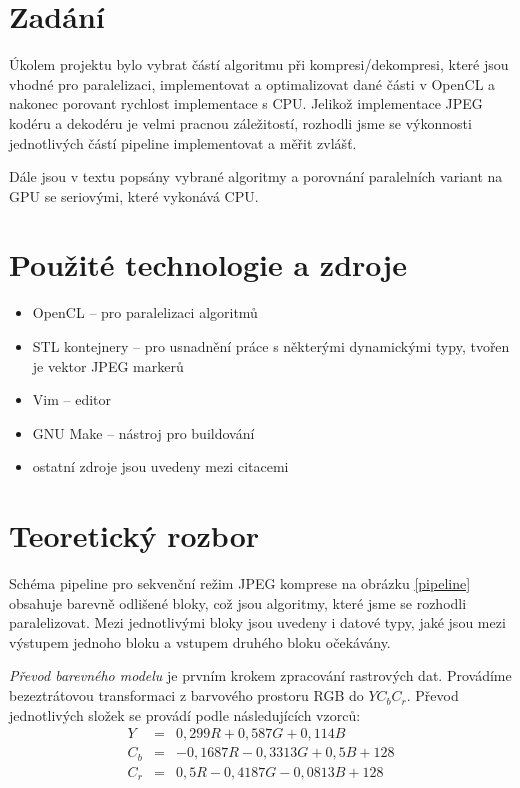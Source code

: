 \documentclass[11pt,a4paper]{article}
\newcommand{\titlepageandcontents}{
  

  \pagestyle{plain}
  \pagenumbering{roman}
  \setcounter{page}{1}

  \newpage
  \pagestyle{plain}
  \pagenumbering{arabic}
  \setcounter{page}{1}
}
\begin{document}
\titlepageandcontents

\section{Zadání}
Úkolem projektu bylo vybrat částí algoritmu při kompresi/dekompresi, které jsou vhodné pro paralelizaci, implementovat
a optimalizovat dané části v OpenCL a nakonec porovant rychlost implementace s CPU. Jelikož implementace JPEG kodéru a
dekodéru je velmi pracnou záležitostí\cite{t81}, rozhodli jsme se výkonnosti jednotlivých částí pipeline implementovat
a měřit zvlášť.

Dále jsou v textu popsány vybrané algoritmy a porovnání paralelních variant na GPU se seriovými, které vykonává CPU.

\section{Použité technologie a zdroje}
\begin{itemize}
\item OpenCL -- pro paralelizaci algoritmů
\item STL kontejnery -- pro usnadnění práce s některými dynamickými typy, tvořen je vektor JPEG markerů
\item Vim -- editor
\item GNU Make -- nástroj pro buildování
\item ostatní zdroje jsou uvedeny mezi citacemi
\end{itemize}

\section{Teoretický rozbor} %
Schéma pipeline pro sekvenční režim JPEG komprese na obrázku \ref{pipeline} obsahuje barevně odlišené bloky, což jsou algoritmy,
které jsme se rozhodli paralelizovat. Mezi jednotlivými bloky jsou uvedeny i datové typy, jaké jsou mezi výstupem
jednoho bloku a vstupem druhého bloku očekávány.

\textit{Převod barevného modelu} je prvním krokem zpracování rastrových dat. Provádíme bezeztrátovou transformaci z barvového prostoru RGB do $YC_bC_r$. Převod jednotlivých složek se provádí podle následujících vzorců:
\begin{eqnarray}
  Y &=& 0,299  R + 0,587  G + 0,114  B\\
  C_b &=& - 0,1687 R - 0,3313 G + 0,5    B + 128\\
  C_r &=&    0,5    R - 0,4187 G - 0,0813 B + 128 
\end{eqnarray}
\end{document}
